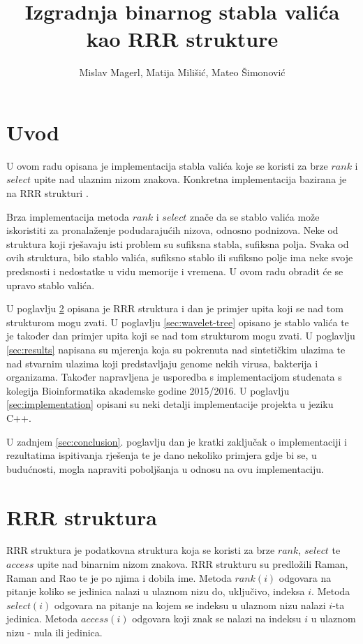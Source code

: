 \documentclass[times, utf8, seminar, numeric]{fer}
\begin{document}
\title{Izgradnja binarnog stabla valića kao RRR strukture}
\author{Mislav Magerl, Matija Milišić, Mateo Šimonović}

\maketitle

\tableofcontents

\chapter{Uvod}
U ovom radu opisana je implementacija stabla valića\citep{alexbowe}  koje se koristi za brze $rank$ i $select$ upite nad ulaznim nizom znakova. Konkretna implementacija bazirana je na RRR strukturi \citep{DBLP:journals/corr/abs-0705-0552}.

Brza implementacija metoda $rank$ i $select$ znače da se stablo valića može iskoristiti za pronalaženje podudarajućih nizova, odnosno podnizova. Neke od struktura koji rješavaju isti problem su sufiksna stabla, sufiksna polja. Svaka od ovih struktura, bilo stablo valića, sufiksno stablo ili sufiksno polje ima neke svoje predsnosti i nedostatke u vidu memorije i vremena. U ovom radu obradit će se upravo stablo valića.

U poglavlju \ref{sec:rrr} opisana je RRR struktura i dan je primjer upita koji se nad tom strukturom mogu zvati. U poglavlju \ref{sec:wavelet-tree} opisano je stablo valića te je također dan primjer upita koji se nad tom strukturom mogu zvati. U poglavlju \ref{sec:results} napisana su mjerenja koja su pokrenuta nad sintetičkim ulazima te nad stvarnim ulazima koji predstavljaju genome nekih virusa, bakterija i organizama. Također napravljena je usporedba s implementacijom studenata s kolegija Bioinformatika akademske godine 2015/2016. U poglavlju \ref{sec:implementation} opisani su neki detalji implementacije projekta u jeziku C++.

U zadnjem \ref{sec:conclusion}. poglavlju dan je kratki zaključak o implementaciji i rezultatima ispitivanja rješenja te je dano nekoliko primjera gdje bi se, u budućnosti, mogla napraviti poboljšanja u odnosu na ovu implementaciju. 

\chapter{RRR struktura}
\label{sec:rrr}
RRR struktura je podatkovna struktura koja se koristi za brze $rank$, $select$ te $access$ upite nad binarnim nizom znakova. RRR strukturu su predložili Raman, Raman and Rao \citep{DBLP:journals/corr/abs-0705-0552} te je po njima i dobila ime. Metoda $rank(i)$ odgovara na pitanje koliko se jedinica nalazi u ulaznom nizu do, uključivo, indeksa $i$. Metoda $select(i)$ odgovara na pitanje na kojem se indeksu u ulaznom nizu nalazi $i$-ta jedinica. Metoda $access(i)$ odgovara koji znak se nalazi na indeksu $i$ u ulaznom nizu - nula ili jedinica.
\end{document}
